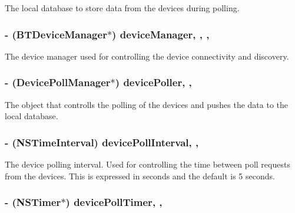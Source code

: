 The local database to store data from the devices during polling. \hypertarget{interface_background_scheduler_aea6a288ffb185db815ddaeaf58c2edcd}{
\subsubsection[{device\-Manager}]{\setlength{\rightskip}{0pt plus 5cm}-\/ ({\bf B\-T\-Device\-Manager}$\ast$) device\-Manager\hspace{0.3cm}{\ttfamily [read]}, {\ttfamily [write]}, {\ttfamily [atomic]}, {\ttfamily [strong]}}}\label{interface_background_scheduler_aea6a288ffb185db815ddaeaf58c2edcd}
The device manager used for controlling the device connectivity and discovery. \hypertarget{interface_background_scheduler_a9f8103a5d35ba76fd32b5f0d3a2d5517}{
\subsubsection[{device\-Poller}]{\setlength{\rightskip}{0pt plus 5cm}-\/ ({\bf Device\-Poll\-Manager}$\ast$) device\-Poller\hspace{0.3cm}{\ttfamily [read]}, {\ttfamily [write]}, {\ttfamily [atomic]}}}\label{interface_background_scheduler_a9f8103a5d35ba76fd32b5f0d3a2d5517}
The object that controlls the polling of the devices and pushes the data to the local database. \hypertarget{interface_background_scheduler_ae2e25ad686446576c71a500b66f31e25}{
\subsubsection[{device\-Poll\-Interval}]{\setlength{\rightskip}{0pt plus 5cm}-\/ (N\-S\-Time\-Interval) device\-Poll\-Interval\hspace{0.3cm}{\ttfamily [read]}, {\ttfamily [write]}, {\ttfamily [atomic]}}}\label{interface_background_scheduler_ae2e25ad686446576c71a500b66f31e25}
The device polling interval. Used for controlling the time between poll requests from the devices. This is expressed in seconds and the default is 5 seconds. \hypertarget{interface_background_scheduler_a9dee3016296e3a529451c25b426b8923}{
\subsubsection[{device\-Poll\-Timer}]{\setlength{\rightskip}{0pt plus 5cm}-\/ (N\-S\-Timer$\ast$) device\-Poll\-Timer\hspace{0.3cm}{\ttfamily [read]}, {\ttfamily [write]}, {\ttfamily [atomic]}}}\label{interface_background_scheduler_a9dee3016296e3a529451c25b426b8923}
